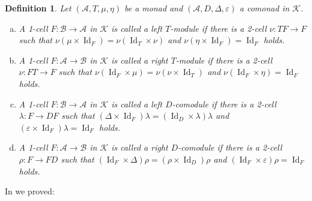 \documentclass[a4paper, 12pt]{article}
\renewcommand{\_}[1]{\mbox{$_{\left( #1 \right)}$}}
\theoremstyle{plain}
\newtheorem{defn}[thm]{Definition}
\newcommand{\A}{{\mathcal A}}
\newcommand{\B}{{\mathcal B}}
\newcommand{\Id}{\operatorname {Id}}
\newcommand{\Epsilon}{\varepsilon}
\def\K{{\mathcal K}}  %
\newcommand{\delabel}[1]{\label{de:#1}}
\begin{document}
\begin{defn} \delabel{(co)modules} \cite[Definition 2.3]{Femic5}
Let $(\A, T, \mu, \eta)$ be a monad and $(\A, D, \Delta, \Epsilon)$ a comonad in $\K$.
\begin{enumerate}[(a)]
\item A 1-cell $F:\B\to\A$ in $\K$ is called a {\em left $T$-module} if there is a 2-cell $\nu: TF\to F$ such that $\nu(\mu\times\Id_F)=\nu(\Id_T\times\nu)$
and $\nu(\eta\times\Id_F)=\Id_F$ holds.
\item A 1-cell $F:\A\to\B$ in $\K$ is called a {\em right $T$-module} if there is a 2-cell $\nu: FT\to F$ such that $\nu(\Id_F\times\mu)=\nu(\nu\times\Id_T)$
and $\nu(\Id_F\times\eta)=\Id_F$ holds.
\item A 1-cell $F:\B\to\A$ in $\K$ is called a {\em left $D$-comodule} if there is a 2-cell $\lambda: F\to DF$ such that $(\Delta\times\Id_F)\lambda=(\Id_D\times\lambda)\lambda$
and $(\Epsilon\times\Id_F)\lambda=\Id_F$ holds.
\item A 1-cell $F:\A\to\B$ in $\K$ is called a {\em right $D$-comodule} if there is a 2-cell $\rho: F\to FD$ such that $(\Id_F\times\Delta)\rho=(\rho\times\Id_D)\rho$
and $(\Id_F\times\Epsilon)\rho=\Id_F$ holds.
\end{enumerate}
\end{defn}

\medskip

In \cite[Proposition 2.4]{Femic5} we proved:
\end{document}
